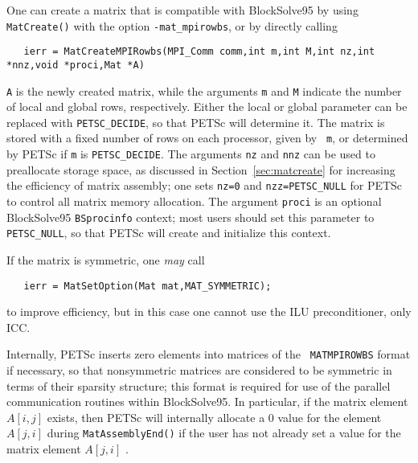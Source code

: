 One can create a matrix that is compatible with BlockSolve95 by using
{\tt MatCreate()} with the option {\tt -mat\_mpirowbs}, or by directly
calling 
\begin{verbatim}
   ierr = MatCreateMPIRowbs(MPI_Comm comm,int m,int M,int nz,int *nnz,void *proci,Mat *A)
\end{verbatim}
{\tt A} is the newly created matrix, while the arguments {\tt m} and
{\tt M} indicate the number of local and global rows,
respectively. Either the local or global parameter can be replaced
with {\tt PETSC\_DECIDE}, so that PETSc will determine it.  The matrix
is stored with a fixed number of rows on each processor, given by {\tt
m}, or determined by PETSc if {\tt m} is {\tt PETSC\_DECIDE}.  The
arguments {\tt nz} and {\tt nnz} can be used to preallocate storage
space, as discussed in Section~\ref{sec:matcreate} for increasing
the efficiency of matrix assembly; one sets {\tt nz=0} and
{\tt nzz=PETSC\_NULL} for PETSc to control all matrix memory
allocation.  The argument {\tt proci} is an optional BlockSolve95
{\tt BSprocinfo} context; most users should set this parameter to 
{\tt PETSC\_NULL}, so that PETSc will create and initialize this context.

If the matrix is symmetric, one {\em may} call
\begin{verbatim}
   ierr = MatSetOption(Mat mat,MAT_SYMMETRIC);
\end{verbatim}
to improve efficiency, but in this case one cannot use the ILU 
preconditioner, only ICC.

Internally, PETSc inserts zero elements into matrices of the {\tt
MATMPIROWBS} format if necessary, so that nonsymmetric matrices are
considered to be symmetric in terms of their sparsity structure; this
format is required for use of the parallel communication routines
within BlockSolve95. In particular, if the matrix element $A[i,j]$
exists, then PETSc will internally allocate a 0 value for the element
$ A[j,i] $ during {\tt MatAssemblyEnd()} if the user has not already set
a value for the matrix element $ A[j,i] $ .

